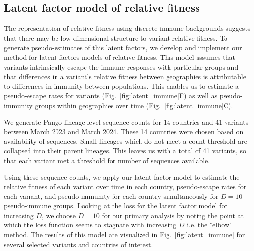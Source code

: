 \documentclass[11pt,oneside,letterpaper]{article}
\def\tbc#1{\textcolor{purple}{[#1]}}
\begin{document}
\subsection*{Latent factor model of relative fitness}

The representation of relative fitness using discrete immune backgrounds suggests that there may be low-dimensional structure to variant relative fitness.
To generate pseudo-estimates of this latent factors, we develop and implement our method for latent factors models of relative fitness.
This model assumes that variants intrinsically escape the immune responses with particular groups and that differences in a variant's relative fitness between geographies is attributable to differences in immunity between populations.
This enables us to estimate a pseudo-escape rates for variants (Fig.~\ref{fig:latent_immune}F) as well as pseudo-immunity groups within geographies over time (Fig.~\ref{fig:latent_immune}C).


We generate Pango lineage-level sequence counts for 14 countries and 41 variants between March 2023 and March 2024.
These 14 countries were chosen based on availability of sequences.
Small lineages which do not meet a count threshold are collapsed into their parent lineages.
This leaves us with a total of 41 variants, so that each variant met a threshold for number of sequences available.

Using these sequence counts, we apply our latent factor model to estimate the relative fitness of each variant over time in each country, pseudo-escape rates for each variant, and pseudo-immunity for each country simultaneously for $D=10$ pseudo-immune groups.
Looking at the loss for the latent factor model for increasing $D$, we choose $D=10$ for our primary analysis by noting the point at which the loss function seems to stagnate with increasing $D$ i.e. the "elbow" method.
The results of this model are visualized in Fig.~\ref{fig:latent_immune} for several selected variants and countries of interest.

\end{document}
